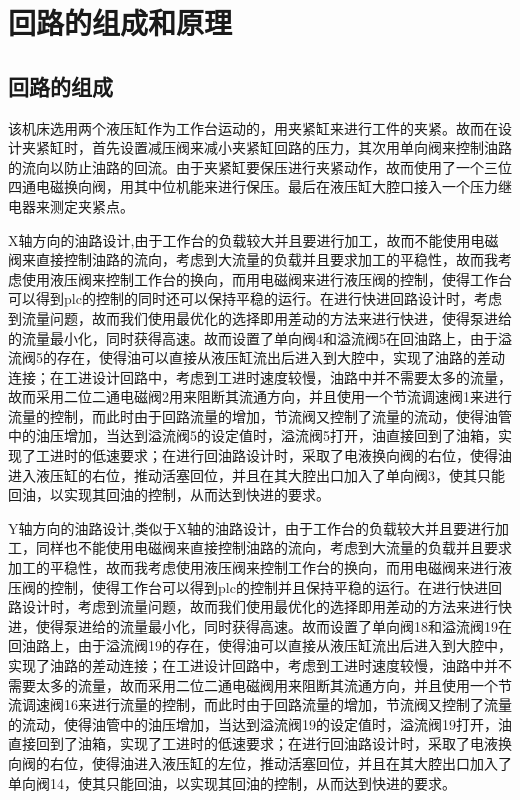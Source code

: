 \section{回路的组成和原理}
\subsection{回路的组成}
该机床选用两个液压缸作为工作台运动的，用夹紧缸来进行工件的夹紧。故而在设计夹紧缸时，首先设置减压阀来减小夹紧缸回路的压力，其次用单向阀来控制油路的流向以防止油路的回流。由于夹紧缸要保压进行夹紧动作，故而使用了一个三位四通电磁换向阀，用其中位机能来进行保压。最后在液压缸大腔口接入一个压力继电器来测定夹紧点。

X轴方向的油路设计,由于工作台的负载较大并且要进行加工，故而不能使用电磁阀来直接控制油路的流向，考虑到大流量的负载并且要求加工的平稳性，故而我考虑使用液压阀来控制工作台的换向，而用电磁阀来进行液压阀的控制，使得工作台可以得到plc的控制的同时还可以保持平稳的运行。在进行快进回路设计时，考虑到流量问题，故而我们使用最优化的选择即用差动的方法来进行快进，使得泵进给的流量最小化，同时获得高速。故而设置了单向阀4和溢流阀5在回油路上，由于溢流阀5的存在，使得油可以直接从液压缸流出后进入到大腔中，实现了油路的差动连接；在工进设计回路中，考虑到工进时速度较慢，油路中并不需要太多的流量，故而采用二位二通电磁阀2用来阻断其流通方向，并且使用一个节流调速阀1来进行流量的控制，而此时由于回路流量的增加，节流阀又控制了流量的流动，使得油管中的油压增加，当达到溢流阀5的设定值时，溢流阀5打开，油直接回到了油箱，实现了工进时的低速要求；在进行回油路设计时，采取了电液换向阀的右位，使得油进入液压缸的右位，推动活塞回位，并且在其大腔出口加入了单向阀3，使其只能回油，以实现其回油的控制，从而达到快进的要求。

Y轴方向的油路设计,类似于X轴的油路设计，由于工作台的负载较大并且要进行加工，同样也不能使用电磁阀来直接控制油路的流向，考虑到大流量的负载并且要求加工的平稳性，故而我考虑使用液压阀来控制工作台的换向，而用电磁阀来进行液压阀的控制，使得工作台可以得到plc的控制并且保持平稳的运行。在进行快进回路设计时，考虑到流量问题，故而我们使用最优化的选择即用差动的方法来进行快进，使得泵进给的流量最小化，同时获得高速。故而设置了单向阀18和溢流阀19在回油路上，由于溢流阀19的存在，使得油可以直接从液压缸流出后进入到大腔中，实现了油路的差动连接；在工进设计回路中，考虑到工进时速度较慢，油路中并不需要太多的流量，故而采用二位二通电磁阀用来阻断其流通方向，并且使用一个节流调速阀16来进行流量的控制，而此时由于回路流量的增加，节流阀又控制了流量的流动，使得油管中的油压增加，当达到溢流阀19的设定值时，溢流阀19打开，油直接回到了油箱，实现了工进时的低速要求；在进行回油路设计时，采取了电液换向阀的右位，使得油进入液压缸的左位，推动活塞回位，并且在其大腔出口加入了单向阀14，使其只能回油，以实现其回油的控制，从而达到快进的要求。

